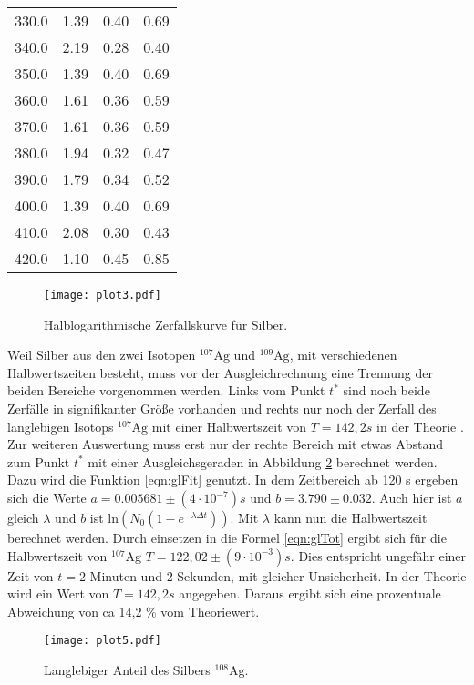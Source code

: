 \begin{table}
\begin{tabular}{c c c c}
  330.0 & 1.39 & 0.40 & 0.69 \\
  340.0 & 2.19 & 0.28 & 0.40 \\
  350.0 & 1.39 & 0.40 & 0.69 \\
  360.0 & 1.61 & 0.36 & 0.59 \\
  370.0 & 1.61 & 0.36 & 0.59 \\
  380.0 & 1.94 & 0.32 & 0.47 \\
  390.0 & 1.79 & 0.34 & 0.52 \\
  400.0 & 1.39 & 0.40 & 0.69 \\
  410.0 & 2.08 & 0.30 & 0.43 \\
  420.0 & 1.10 & 0.45 & 0.85 \\
  \bottomrule
\end{tabular}
\end{table}
\FloatBarrier

\begin{figure}
  \centering
  \texttt{[image: plot3.pdf]}
  \caption{Halblogarithmische Zerfallskurve für Silber.}
  \label{fig:plot2}
\end{figure}
\FloatBarrier

Weil Silber aus den zwei Isotopen $^{107}\text{Ag}$ und $^{109}\text{Ag}$, mit verschiedenen Halbwertszeiten besteht, muss vor der Ausgleichrechnung eine Trennung der beiden Bereiche vorgenommen werden.
Links vom Punkt $t^*$ sind noch beide Zerfälle in signifikanter Größe vorhanden und rechts nur noch der Zerfall des langlebigen Isotops $^{107}\text{Ag}$ mit einer Halbwertszeit von $T = 142,2 s$ in der Theorie \cite{Periode}.
Zur weiteren Auswertung muss erst nur der rechte Bereich mit etwas Abstand zum Punkt $t^*$ mit einer Ausgleichsgeraden in Abbildung \ref{fig:plot3} berechnet werden.
Dazu wird die Funktion \ref{eqn:glFit} genutzt.
In dem Zeitbereich ab 120 s ergeben sich die Werte $a =  0.005681 \pm (4 \cdot 10^{-7}) s$ und $b = 3.790 \pm 0.032$.
Auch hier ist $a$ gleich $\lambda$ und $b$ ist $\text{ln}(N_0(1-e^{-\lambda \Delta t}))$.
Mit $\lambda$ kann nun die Halbwertszeit berechnet werden.
Durch einsetzen in die Formel \ref{eqn:glTot} ergibt sich für die Halbwertszeit von $^{107}\text{Ag}$ $T = 122,02 \pm (9 \cdot 10^{-3}) s$.
Dies entspricht ungefähr einer Zeit von $t = 2$ Minuten und 2 Sekunden, mit gleicher Unsicherheit.
In der Theorie wird ein Wert von $T = 142,2 s$ \cite{Periode} angegeben.
Daraus ergibt sich eine prozentuale Abweichung von ca 14,2 \% vom Theoriewert.

\begin{figure}
  \centering
  \texttt{[image: plot5.pdf]}
  \caption{Langlebiger Anteil des Silbers $^{108}\text{Ag}$.}
  \label{fig:plot3}
\end{figure}
\FloatBarrier

